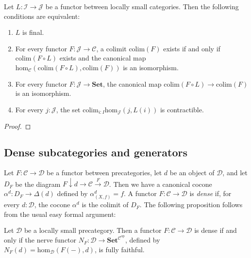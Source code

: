 \documentclass[reqno]{amsart}
\theoremstyle{definition}
\theoremstyle{remark}
\newcommand{\fs}[1]{\mathrm{#1}}
\newcommand{\cat}[1]{\mathbf{#1}}
\newcommand{\scat}[1]{\mathcal{#1}}
\renewcommand{\hom}{\fs{hom}}
\newcommand{\Set}{\cat{Set}}
\numberwithin{figure}{section}
\begin{document}
\begin{prop}
Let $L : \scat{I} \to \scat{J}$ be a functor between locally small categories.
Then the following conditions are equivalent:
\begin{enumerate}
\item $L$ is final.
\item For every functor $F : \scat{J} \to \scat{C}$, a colimit $\fs{colim}(F)$ exists if and only if $\fs{colim}(F \circ L)$ exists and the canonical map $\hom_\scat{C}(\fs{colim}(F \circ L),\fs{colim}(F))$ is an isomorphism.
\item For every functor $F : \scat{J} \to \cat{Set}$, the canonical map $\fs{colim}(F \circ L) \to \fs{colim}(F)$ is an isomorphism.
\item For every $j : \scat{J}$, the set $\fs{colim}_{i : I} \hom_\scat{J}(j,L(i))$ is contractible.
\end{enumerate}
\end{prop}
\begin{proof}
\end{proof}


\subsection{Dense subcategories and generators}

Let $F : \scat{C} \to \scat{D}$ be a functor between precategories, let $d$ be an object of $\scat{D}$, and let $D_F$ be the diagram $F \downarrow d \to \scat{C} \xrightarrow{F} \scat{D}$.
Then we have a canonical cocone $\alpha^d : D_F \to \Delta(d)$ defined by $\alpha^d_{(X,f)} = f$.
A functor $F : \scat{C} \to \scat{D}$ is \emph{dense} if, for every $d : \scat{D}$, the cocone $\alpha^d$ is the colimit of $D_F$.
The following proposition follows from the usual easy formal argument:

\begin{prop}
Let $\scat{D}$ be a locally small precategory.
Then a functor $F : \scat{C} \to \scat{D}$ is dense if and only if the nerve functor $N_F : \scat{D} \to \Set^{\scat{C}^\fs{op}}$, defined by $N_F(d) = \hom_\scat{D}(F(-),d)$, is fully faithful.
\end{prop}
\end{document}
